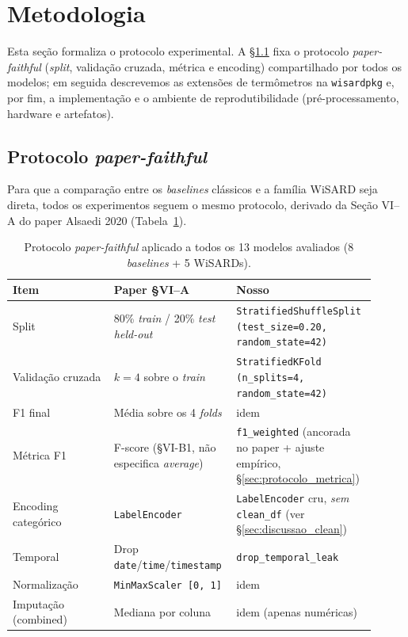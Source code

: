 \section{Metodologia}
\label{sec:metodologia}

Esta seção formaliza o protocolo experimental. A
\S{}\ref{sec:protocolo} fixa o protocolo \emph{paper-faithful}
(\emph{split}, validação cruzada, métrica e encoding) compartilhado por
todos os modelos; em seguida descrevemos as extensões de termômetros na
\texttt{wisardpkg} e, por fim, a implementação e o ambiente de
reprodutibilidade (pré-processamento, hardware e artefatos).

\subsection{Protocolo \emph{paper-faithful}}
\label{sec:protocolo}

Para que a comparação entre os \emph{baselines} clássicos e a família
WiSARD seja direta, todos os experimentos seguem o mesmo protocolo,
derivado da Seção VI--A do paper Alsaedi 2020
(Tabela~\ref{tab:protocolo}).

\begin{table}[ht]
  \centering
  \caption{Protocolo \emph{paper-faithful} aplicado a todos os 13
           modelos avaliados (8 \emph{baselines} + 5 WiSARDs).}
  \label{tab:protocolo}
  \small
  \renewcommand{\arraystretch}{1.15}
  \begin{tabular}{p{0.27\linewidth} p{0.32\linewidth} p{0.32\linewidth}}
    \toprule
    \textbf{Item} & \textbf{Paper \S{}VI--A} & \textbf{Nosso} \\
    \midrule
    Split & 80\% \emph{train} / 20\% \emph{test} \emph{held-out} & \texttt{StratifiedShuffleSplit (test\_size=0.20, random\_state=42)} \\
    Validação cruzada & $k=4$ sobre o \emph{train} & \texttt{StratifiedKFold (n\_splits=4, random\_state=42)} \\
    F1 final & Média sobre os 4 \emph{folds} & idem \\
    Métrica F1 & F-score (\S{}VI-B1, não especifica \emph{average}) & \texttt{f1\_weighted} (ancorada no paper + ajuste empírico, \S{}\ref{sec:protocolo_metrica}) \\
    Encoding categórico & \texttt{LabelEncoder} & \texttt{LabelEncoder} cru, \emph{sem} \texttt{clean\_df} (ver \S{}\ref{sec:discussao_clean}) \\
    Temporal & Drop \texttt{date}/\texttt{time}/\texttt{timestamp} & \texttt{drop\_temporal\_leak} \\
    Normalização & \texttt{MinMaxScaler [0, 1]} & idem \\
    Imputação (combined) & Mediana por coluna & idem (apenas numéricas) \\
    \bottomrule
  \end{tabular}
\end{table}

